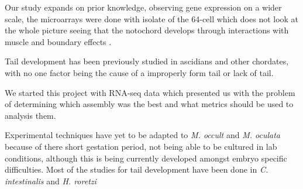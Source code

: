 Our study expands on prior knowledge, observing gene expression on a wider scale, the microarrays were done with isolate of the 64-cell which does not look at the whole picture seeing that the notochord develops through interactions with muscle and boundary effects \cite{keller_mechanisms_2000,veeman_chongmague_2008}.

Tail development has been previously studied in ascidians and other chordates, with no one factor being the cause of a improperly form tail or lack of tail. 

We started this project with RNA-seq data which presented us with the problem of determining which assembly was the best and what metrics should be used to analysis them.

Experimental techniques have yet to be adapted to \textit{M. occult} and \textit{M. oculata} because of there short gestation period, not being able to be cultured in lab conditions, although this is being currently developed amongst embryo specific difficulties. Most of the studies for tail development have been done in \textit{C. intestinalis} and \textit{H. roretzi}  
